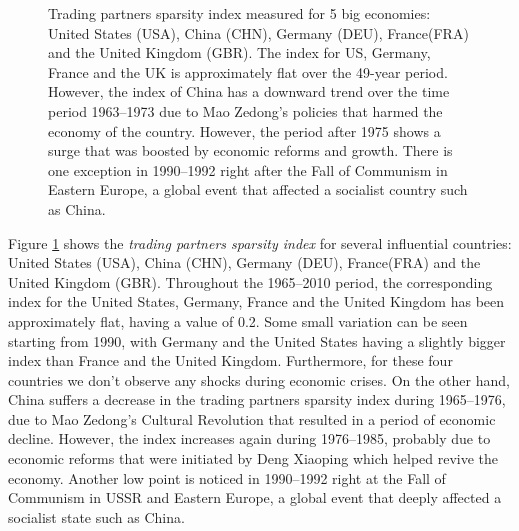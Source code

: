 \begin{figure}[H]
\caption[Trading partners sparsity index -- United States (USA), China (CHN), Germany (DEU), France(FRA) and the United Kingdom (GBR)]{Trading partners sparsity index measured for 5 big economies: United States (USA), China (CHN), Germany (DEU), France(FRA) and the United Kingdom (GBR). The index for US, Germany, France and the UK is approximately flat over the 49-year period. However, the index of China has a downward trend over the time period 1963--1973 due to Mao Zedong's policies that harmed the economy of the country. However, the period after 1975 shows a surge that was boosted by economic reforms and growth. There is one exception in 1990--1992 right after the Fall of Communism in Eastern Europe, a global event that affected a socialist country such as China.}
\label{g7_sparsity_index}
\end{figure}

Figure \ref{g7_sparsity_index} shows the \emph{trading partners sparsity index} for several influential countries: United States (USA), China (CHN), Germany (DEU), France(FRA) and the United Kingdom (GBR). Throughout the 1965--2010 period, the corresponding index for the United States, Germany, France and the United Kingdom has been approximately flat, having a value of 0.2. Some small variation can be seen starting from 1990, with Germany and the United States having a slightly bigger index than France and the United Kingdom. Furthermore, for these four countries we don't observe any shocks during economic crises. On the other hand, China suffers a decrease in the trading partners sparsity index during 1965--1976, due to Mao Zedong's Cultural Revolution that resulted in a period of economic decline. However, the index increases again during 1976--1985, probably due to economic reforms that were initiated by Deng Xiaoping which helped revive the economy. Another low point is noticed in 1990--1992 right at 
the Fall of Communism in USSR and Eastern Europe, a global event that deeply affected a socialist state such as China.

